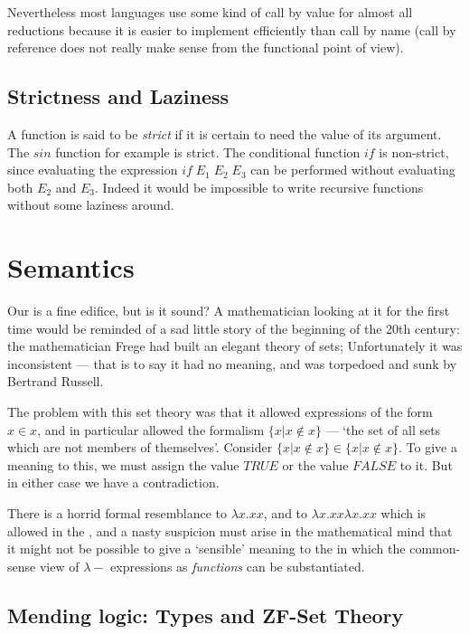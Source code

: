 Nevertheless most languages use some kind of call by value for almost all
reductions because it is easier to implement efficiently than call by name
(call by reference does not really make sense from the functional point of
view).

\subsection{Strictness and Laziness}
A function is said to be {\em strict} if it is certain to need the value of
its argument. The $sin$ function for example is strict. The conditional
function $if$ is non-strict, since evaluating the expression
$if\;E_1\;E_2\;E_3$ can be performed without evaluating both $E_2$ and
$E_3$.  Indeed it would be impossible to write recursive functions without
some laziness around.



\section{Semantics}

Our \LC is a fine edifice, but is it sound?  A mathematician looking at it
for the first time would be reminded of a sad little story of the beginning
of the 20th century: the mathematician Frege had built an elegant
theory of sets; Unfortunately it was inconsistent --- that is to say it had
no meaning, and was torpedoed and sunk by Bertrand Russell.

The problem with this set theory was that it allowed expressions of the
form $x\in x$, and in particular allowed the formalism $\{x|x\not\in x\}$
--- `the set of all sets which are not members of themselves'. Consider
$\{x|x\not\in x\}\in\{x|x\not\in x\}$. To give a meaning to this, we must
assign the value $TRUE$ or the value $FALSE$ to it. But in either case we
have a contradiction.

There is a  horrid formal resemblance  to $\lambda x.xx$,  and to  $\lambda
x.xx\lambda x.xx$ which is allowed in  the \LC, and a nasty suspicion  must
arise in the  mathematical mind  that it might  not be  possible to  give a
`sensible' meaning to the \LC in which the common-sense view of  $\lambda-$
expressions as {\em functions} can be substantiated.

\subsection{Mending logic: Types and ZF-Set Theory}


